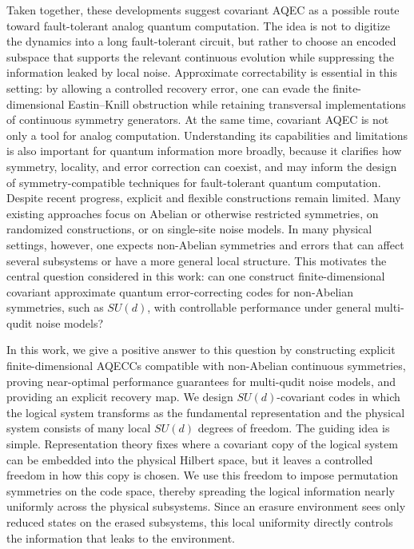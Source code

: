 \documentclass[10pt,twocolumn,superscriptaddress,aps,amsmath,amssymb,citeautoscript,floatfix,prx,longbibliography]{revtex4-2}
\theoremstyle{plain}
\theoremstyle{plain}
\theoremstyle{plain}
\theoremstyle{plain}
\theoremstyle{plain}
\theoremstyle{plain}
\begin{document}
Taken together, these developments suggest covariant AQEC as a possible route toward fault-tolerant analog quantum computation. The idea is not to digitize the dynamics into a long fault-tolerant circuit, but rather to choose an encoded subspace that supports the relevant continuous evolution while suppressing the information leaked by local noise. Approximate correctability is essential in this setting: by allowing a controlled recovery error, one can evade the finite-dimensional Eastin--Knill obstruction while retaining transversal implementations of continuous symmetry generators. At the same time, covariant AQEC is not only a tool for analog computation. Understanding its capabilities and limitations is also important for quantum information more broadly, because it clarifies how symmetry, locality, and error correction can coexist, and may inform the design of symmetry-compatible techniques for fault-tolerant quantum computation. Despite recent progress, explicit and flexible constructions remain limited. Many existing approaches focus on Abelian or otherwise restricted symmetries, on randomized constructions, or on single-site noise models. In many physical settings, however, one expects non-Abelian symmetries and errors that can affect several subsystems or have a more general local structure. This motivates the central question considered in this work: can one construct finite-dimensional covariant approximate quantum error-correcting codes for non-Abelian symmetries, such as $SU(d)$, with controllable performance under general multi-qudit noise models?

In this work, we give a positive answer to this question by constructing explicit finite-dimensional AQECCs compatible with non-Abelian continuous symmetries, proving near-optimal performance guarantees for multi-qudit noise models, and providing an explicit recovery map. We design $SU(d)$-covariant codes in which the logical system transforms as the fundamental representation and the physical system consists of many local $SU(d)$ degrees of freedom. The guiding idea is simple. Representation theory fixes where a covariant copy of the logical system can be embedded into the physical Hilbert space, but it leaves a controlled freedom in how this copy is chosen. We use this freedom to impose permutation symmetries on the code space, thereby spreading the logical information nearly uniformly across the physical subsystems. Since an erasure environment sees only reduced states on the erased subsystems, this local uniformity directly controls the information that leaks to the environment.
\end{document}
